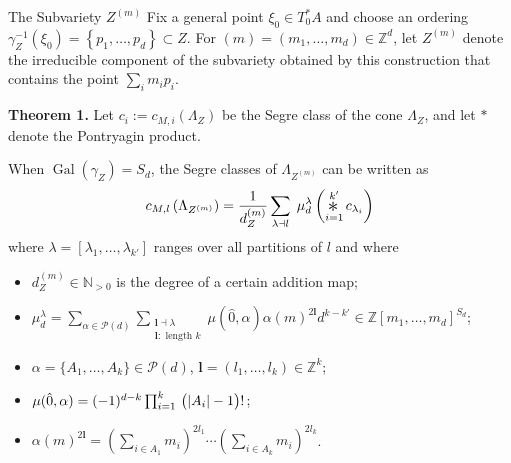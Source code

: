 \documentclass[final]{beamer}
\numberwithin{equation}{section}
\theoremstyle{plain}
\newlength{\colwidth}
\DeclareMathOperator{\Gal}{\operatorname{Gal}}
\newcommand{\bigast}{\mathop{\scalebox{1.5}{\raisebox{-0.2ex}{$\ast$}}}}%
\begin{document}
\begin{frame}[t]
\begin{columns}[t]
\begin{column}{\colwidth}
\begin{block}{The Subvariety $Z^{(m)}$}
  Fix a general point $\xi_0 \in T_0^*A$ and choose an ordering
  $\gamma_Z^{-1}(\xi_0)= \left\{ p_1,\ldots,p_d \right\} \subset Z$. For $(m)=(m_1,\ldots,m_d)\in\mathbb{Z}^d$, let $Z^{(m)}$ denote the irreducible component of the subvariety obtained by this construction that contains the point $\sum_i m_i p_i$.
  
  \begin{tcolorbox}[
    colback=red!10,
    colframe=gray!60,
    boxrule=0.5pt,
    arc=4pt,
    left=12pt,right=12pt,top=12pt,bottom=12pt
  ]
  \textbf{Theorem 1.}
  Let $c_i := c_{M,i}(\Lambda_Z)$ be the Segre class of the cone $\Lambda_Z$, and let $*$ denote the Pontryagin product.
  
  When $\Gal(\gamma_{Z})=S_d$, the Segre classes of $\Lambda_{Z^{(m)}}$ can be written as
  \begin{equation*}
  \begin{aligned}
    c_{M,l}\left(\Lambda_{Z^{(m)}}\right)=\;& \frac{1}{d_Z^{(m)}} \sum_{\lambda \dashv l} \;\mu_d^{\lambda} \left( \bigast_{i=1}^{k'} c_{\lambda_i}\right) \\ 
  \end{aligned}
  \end{equation*}
  where $\lambda= [\lambda_1,\ldots,\lambda_{k'}]$ ranges over all partitions of $l$ and where
  \begin{itemize}
  \item $d_Z^{(m)} \in \mathbb{N}_{>0}$ is the degree of a certain addition map;
  \item $\mu_d^{\lambda}= \sum_{\alpha \in \mathcal{P}(d)} \sum_{\substack{\boldsymbol{l} \dashv \lambda\\\boldsymbol{l}:\text{ length }k}}  \mu(\hat{0},\alpha)    \alpha(m)^{2\boldsymbol{l}} d^{k-k'} \in \mathbb{Z}[m_1,\ldots, m_d]^{S_d}$;
  \item $\alpha=\{A_1,\ldots,A_k\} \in \mathcal{P}(d)$, $\boldsymbol{l}=(l_1,\ldots,l_k) \in \mathbb{Z}^k$;
  \item $\mu(\hat{0}, \alpha) = (-1)^{d-k} \prod_{i=1}^{k}\, \left(\rule{0mm}{3mm}|A_i|-1\right)!$;
  \item $\alpha(m)^{2\boldsymbol{l}}=  \left( \sum_{i \in A_1}m_i \right)^{2l_1} \cdots \left( \sum_{i \in A_k}m_i \right)^{2l_k}$.
  \end{itemize}
  \end{tcolorbox}
  

\end{block}
\end{column}
\end{columns}
\end{frame}
\end{document}
